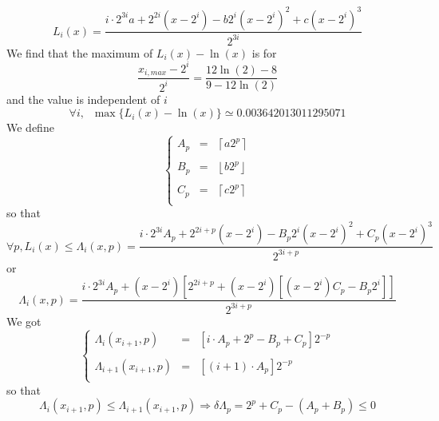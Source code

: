 \documentclass[aps]{revtex4}
\newcommand{\myfloor}[1]{{\left\lfloor#1\right\rfloor}}
\newcommand{\myceil}[1]{{\left\lceil#1\right\rceil}}
\begin{document}
\begin{equation}
	L_i(x) = \dfrac{
	i\cdot2^{3i}a
	+ 2^{2i}\left(x-2^i\right)
	- b 2^{i}\left(x-2^i\right)^2
	+ c      \left(x-2^i\right)^3
	}
	{2^{3i}} 
\end{equation}
We find that the maximum of $L_i(x)-\ln(x)$ is for 
\begin{equation}
	\dfrac{x_{i,max}-2^i}{2^i} = \dfrac{12\ln(2)-8}{9-12\ln(2)}
\end{equation}
and the value is independent of $i$
\begin{equation}
	\forall i, \;\; \max\lbrace L_i(x)-\ln(x)\rbrace \simeq 0.003642013011295071
\end{equation}
We define 
\begin{equation}
\left\lbrace
\begin{array}{rcl}
A_p & = & \myceil{a 2^p} \\
\\
B_p & = & \myfloor{b 2^p}\\
\\
C_p & = & \myceil{c 2^p} \\
\end{array}
\right.
\end{equation}
so that
\begin{equation}
	\forall p, L_i(x) \leq 
	\Lambda_i(x,p) =
	 \dfrac{
	i\cdot2^{3i}A_p
	+ 2^{2i+p}\left(x-2^i\right)
	- B_p 2^{i}\left(x-2^i\right)^2
	+ C_p      \left(x-2^i\right)^3
	 }{2^{3i+p}}
\end{equation}
or
\begin{equation}
\Lambda_i(x,p) =
	 \dfrac{
	i\cdot2^{3i}A_p
	+ \left(x-2^i\right) 
	\left[
		2^{2i+p}
		+ \left(x-2^i\right) 
		\left[
		\left(x-2^i\right) C_p - B_p 2^i
		\right]
	\right]
	 }{2^{3i+p}}
\end{equation}
We got
\begin{equation}
\left\lbrace
\begin{array}{rcl}
	\Lambda_i(x_{i+1},p) & = & \left[ i \cdot A_p + 2^p - B_p + C_p \right] 2^{-p}\\
	\\
	\Lambda_{i+1}(x_{i+1},p) & = & \left[  (i+1) \cdot A_p \right] 2^{-p} \\
\end{array}
\right.
\end{equation}
so that
\begin{equation}
	\Lambda_i(x_{i+1},p) \leq \Lambda_{i+1}(x_{i+1},p) \Rightarrow \delta\Lambda_p = 2^p + C_p - (A_p+B_p) \leq 0
\end{equation}
\end{document}
